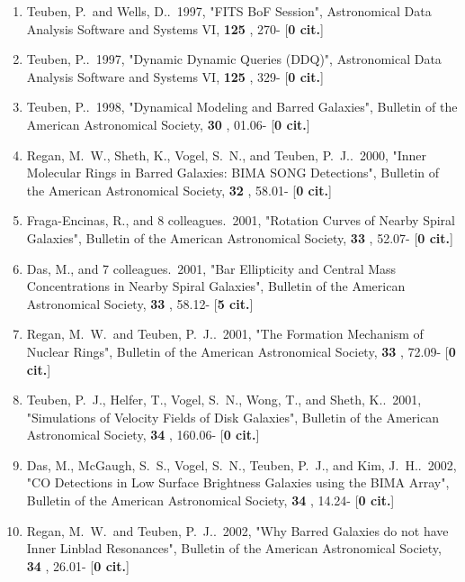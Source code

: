 \documentclass[11pt,letterpaper]{article}
\begin{document}
\begin{enumerate}[resume,label=\textbf{\arabic*}.]
\item  
Teuben, P.~and Wells, D..\  1997,  "FITS BoF Session", Astronomical Data 
Analysis Software and Systems VI,  {\bf 125} , 270- [{\bf 0 cit.}] 

\item  
Teuben, P..\  1997,  "Dynamic Dynamic Queries (DDQ)", Astronomical Data 
Analysis Software and Systems VI,  {\bf 125} , 329- [{\bf 0 cit.}]

\item  
Teuben, P..\  1998,  "Dynamical Modeling and Barred Galaxies", Bulletin of 
the American Astronomical Society,  {\bf 30} , 01.06- [{\bf 0 cit.}]

\item  
Regan, M.~W., Sheth, K., Vogel, S.~N., and Teuben, P.~J..\  2000,  "Inner 
Molecular Rings in Barred Galaxies: BIMA SONG Detections", Bulletin of the 
American Astronomical Society,  {\bf 32} , 58.01- [{\bf 0 cit.}] 

\item  
Fraga-Encinas, R., and 8 colleagues.\  2001,  "Rotation Curves of Nearby 
Spiral Galaxies", Bulletin of the American Astronomical Society,  {\bf 33} 
, 52.07- [{\bf 0 cit.}] 

\item  
Das, M., and 7 colleagues.\  2001,  "Bar Ellipticity and Central Mass 
Concentrations in Nearby Spiral Galaxies", Bulletin of the American 
Astronomical Society,  {\bf 33} , 58.12- [{\bf 5 cit.}] 

\item  
Regan, M.~W.~and Teuben, P.~J..\  2001,  "The Formation Mechanism of 
Nuclear Rings", Bulletin of the American Astronomical Society,  {\bf 33} , 
72.09- [{\bf 0 cit.}] 
\item  
Teuben, P.~J., Helfer, T., Vogel, S.~N., Wong, T., and Sheth, K..\  2001,  
"Simulations of Velocity Fields of Disk Galaxies", Bulletin of the American 
Astronomical Society,  {\bf 34} , 160.06- [{\bf 0 cit.}] 
\item  
Das, M., McGaugh, S.~S., Vogel, S.~N., Teuben, P.~J., and Kim, J.~H..\  
2002,  "CO Detections in Low Surface Brightness Galaxies using the BIMA 
Array", Bulletin of the American Astronomical Society,  {\bf 34} , 14.24- 
[{\bf 0 cit.}] 

\item  
Regan, M.~W.~and Teuben, P.~J..\  2002,  "Why Barred Galaxies do not have 
Inner Linblad Resonances", Bulletin of the American Astronomical Society,  
{\bf 34} , 26.01- [{\bf 0 cit.}] 


\end{enumerate}
\end{document}
